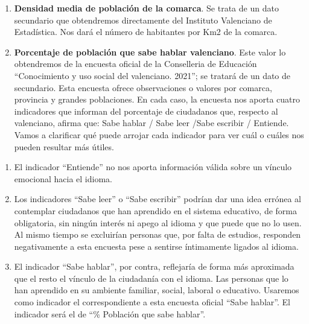 \documentclass[
]{article}
\providecommand{\tightlist}{%
  \setlength{\itemsep}{0pt}\setlength{\parskip}{0pt}}
\begin{document}
\begin{enumerate}
\def\labelenumi{\arabic{enumi}.}
\tightlist
\item
  \textbf{Densidad media de población de la comarca}. Se trata de un
  dato secundario que obtendremos directamente del Instituto Valenciano
  de Estadística. Nos dará el número de habitantes por Km2 de la
  comarca.
\item
  \textbf{Porcentaje de población que sabe hablar valenciano}. Este
  valor lo obtendremos de la encuesta oficial de la Conselleria de
  Educación ``Conocimiento y uso social del valenciano. 2021''; se
  tratará de un dato de secundario. Esta encuesta ofrece observaciones o
  valores por comarca, provincia y grandes poblaciones. En cada caso, la
  encuesta nos aporta cuatro indicadores que informan del porcentaje de
  ciudadanos que, respecto al valenciano, afirma que: Sabe hablar / Sabe
  leer /Sabe escribir / Entiende. Vamos a clarificar qué puede arrojar
  cada indicador para ver cuál o cuáles nos pueden resultar más útiles.
\end{enumerate}

\begin{enumerate}
\def\labelenumi{\alph{enumi}.}
\tightlist
\item
  El indicador ``Entiende'' no nos aporta información válida sobre un
  vínculo emocional hacia el idioma.
\item
  Los indicadores ``Sabe leer'' o ``Sabe escribir'' podrían dar una idea
  errónea al contemplar ciudadanos que han aprendido en el sistema
  educativo, de forma obligatoria, sin ningún interés ni apego al idioma
  y que puede que no lo usen. Al mismo tiempo se excluirían personas
  que, por falta de estudios, responden negativamente a esta encuesta
  pese a sentirse íntimamente ligados al idioma.
\item
  El indicador ``Sabe hablar'', por contra, reflejaría de forma más
  aproximada que el resto el vínculo de la ciudadanía con el idioma. Las
  personas que lo han aprendido en su ambiente familiar, social, laboral
  o educativo. Usaremos como indicador el correspondiente a esta
  encuesta oficial ``Sabe hablar''. El indicador será el de ``\%
  Población que sabe hablar''.
\end{enumerate}
\end{document}
